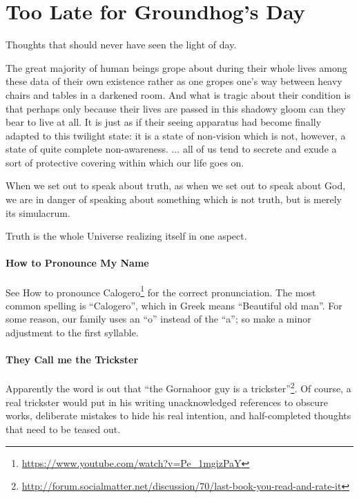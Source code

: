 \section{Too Late for Groundhog’s Day}

Thoughts that should never have seen the light of day.

\begin{quotex}
The great majority of human beings grope about during their whole lives among these data of their own existence rather as one gropes one's way between heavy chairs and tables in a darkened room. And what is tragic about their condition is that perhaps only because their lives are passed in this shadowy gloom can they bear to live at all. It is just as if their seeing apparatus had become finally adapted to this twilight state: it is a state of non-vision which is not, however, a state of quite complete non-awareness. ... all of us tend to secrete and exude a sort of protective covering within which our life goes on.

When we set out to speak about truth, as when we set out to speak about God, we are in danger of speaking about something which is not truth, but is merely its simulacrum.

Truth is the whole Universe realizing itself in one aspect.
\end{quotex}


\paragraph{How to Pronounce My Name}


See How to pronounce Calogero\footnote{\url{https://www.youtube.com/watch?v=Pe_1mgizPaY}} for the correct pronunciation. The most common spelling is ``Calogero'', which in Greek means ``Beautiful old man''. For some reason, our family uses an ``o'' instead of the ``a''; so make a minor adjustment to the first syllable.

\paragraph{They Call me the Trickster}


Apparently the word is out that ``the Gornahoor guy is a trickster''\footnote{\url{http://forum.socialmatter.net/discussion/70/last-book-you-read-and-rate-it}}. Of course, a real trickster would put in his writing unacknowledged references to obscure works, deliberate mistakes to hide his real intention, and half-completed thoughts that need to be teased out.

